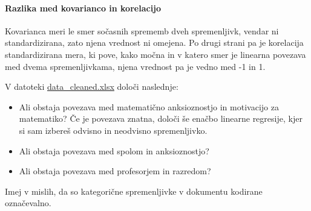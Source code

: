 \paragraph{Razlika med kovarianco in korelacijo}

Kovarianca meri le smer sočasnih sprememb dveh spremenljivk, vendar ni standardizirana, zato njena vrednost ni omejena. Po drugi strani pa je korelacija standardizirana mera, ki pove, kako močna in v katero smer je linearna povezava med dvema spremenljivkama, njena vrednost pa je vedno med -1 in 1.

\begin{Vaje}{1}
    V datoteki \href{https://github.com/borbregant/ai_tandem_learning/blob/main/data_cleaned.xlsx}{data\_cleaned.xlsx} določi naslednje:
    \begin{itemize}
        \item Ali obstaja povezava med matematično anksioznostjo in motivacijo za matematiko? Če je povezava znatna, določi še enačbo linearne regresije, kjer si sam izbereš odvisno in neodvisno spremenljivko.
        \item Ali obstaja povezava med spolom in anksioznostjo?
        \item Ali obstaja povezava med profesorjem in razredom?
    \end{itemize}
    Imej v mislih, da so kategorične spremenljivke v dokumentu kodirane označevalno.
\end{Vaje}
